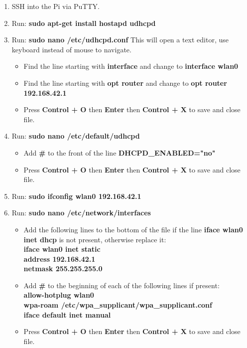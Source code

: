 \documentclass[titlepage,12pt,letter]{report}
\numberwithin{equation}{chapter}
\begin{document}
\begin{enumerate}[itemsep = 5pt,topsep=0pt]
	\item SSH into the Pi via PuTTY.
	\item Run: \textbf{sudo apt-get install hostapd udhcpd}
	\item Run: \textbf{sudo nano /etc/udhcpd.conf} This will open a text editor, use keyboard instead of mouse to navigate.
		\begin{itemize}[noitemsep,topsep=0pt]
			\item Find the line starting with \textbf{interface} and change to \textbf{interface wlan0}
			\item Find the line starting with \textbf{opt router} and change to \textbf{opt router 192.168.42.1}
			\item Press \textbf{Control + O} then \textbf{Enter} then \textbf{Control + X} to save and close file.
		\end{itemize}
	
	\item Run: \textbf{sudo nano /etc/default/udhcpd}
	\begin{itemize}[noitemsep,topsep=0pt]
		\item Add \textbf{\#} to the front of the line \textbf{DHCPD\_ENABLED="no"}
		\item Press \textbf{Control + O} then \textbf{Enter} then \textbf{Control + X} to save and close file.
	\end{itemize}

	\item Run: \textbf{sudo ifconfig wlan0 192.168.42.1}
	\item Run: \textbf{sudo nano /etc/network/interfaces}
	\begin{itemize}[noitemsep,topsep=0pt]
		\item Add the following lines to the bottom of the file if the line \textbf{iface wlan0 inet dhcp} is not present, otherwise replace it: \\
		\textbf{iface wlan0 inet static} \\
		\textbf{address 192.168.42.1} \\
		\textbf{netmask 255.255.255.0}
		\item Add \textbf{\#} to the beginning of each of the following lines if present: \\
		\textbf{allow-hotplug wlan0}\\
		\textbf{wpa-roam /etc/wpa\_supplicant/wpa\_supplicant.conf}\\
		\textbf{iface default inet manual}
		\item Press \textbf{Control + O} then \textbf{Enter} then \textbf{Control + X} to save and close file.
	\end{itemize}


\end{enumerate}
\end{document}
